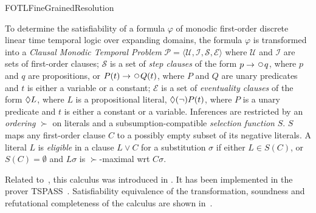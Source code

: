 \begin{entry}{FOTLFineGrainedResolution}

 \begin{clarifications}
%
To determine the satisfiability of a formula $\varphi$ of monodic first-order
discrete linear time temporal logic over expanding domains, the
formula $\varphi$ is transformed into a \emph{Clausal Monodic Temporal Problem}
$\mathcal{P} = \langle \mathcal{U, I, S, E} \rangle$ 
where $\mathcal{U}$
and $\mathcal{I}$ 
are sets of first-order clauses;
$\mathcal{S}$ 
is a set of \emph{step clauses} of the form
$p\rightarrow\Next q$,
where $p$ and $q$ are propositions, or
$P(t)\rightarrow\Next Q(t)$, where $P$ and $Q$ are unary predicates
and $t$ is either a variable or a constant;
$\mathcal{E}$  
is a set of \emph{eventuality clauses}
of the form $\Diamond L$, where $L$ is a propositional literal,
$\Diamond (\neg)P(t)$, where $P$ is a unary predicate and $t$ is
either a constant or a variable.
%
Inferences are restricted by an \emph{ordering} $\succ$ on literals
and a subsumption-compatible \emph{selection function} $S$. $S$ maps
any first-order clause $C$ to a possibly empty subset of its negative literals. 
A literal $L$ is \emph{eligible} in a clause $L\lor C$ for a
substitution $\sigma$ if either $L\in S(C)$, or $S(C)=\emptyset$  and
$L\sigma$ is $\succ$-maximal wrt $C\sigma$.
\end{clarifications}

\begin{history}
Related to~, this calculus was introduced in
\cite{Ludwig+Hustadt@CADE2009}.
It has been implemented in the prover TSPASS~\cite{Ludwig+Hustadt@AIC2010}.
Satisfiability equivalence of the transformation, soundness and
refutational completeness of the calculus are shown in~\cite{Ludwig@Liverpool2010}.
\end{history}


\end{entry}
